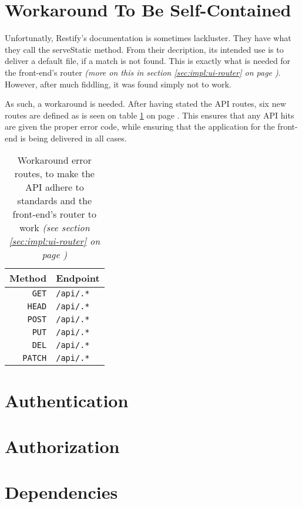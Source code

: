 	\section{Workaround To Be Self-Contained}
		Unfortunatly, Restify's documentation is sometimes lackluster. They have what they call the serveStatic method. From their decription, its intended use is to deliver a default file, if a match is not found. This is exactly what is needed for the front-end's router \emph{(more on this in section \ref{sec:impl:ui-router} on page \pageref{sec:impl:ui-router})}. However, after much fiddling, it was found simply not to work.

		As such, a workaround is needed. After having stated the API routes, six new routes are defined as is seen on table \ref{tab:api:workaround} on page \pageref{tab:api:workaround}. This ensures that any API hits are given the proper error code, while ensuring that the application for the front-end is being delivered in all cases.
		\begin{table}
			\begin{tabular}{r | l}
				\textbf{Method} & \textbf{Endpoint} \\
				\hline
				\verb=GET=		& \verb=/api/.*= \\
				\verb=HEAD=		& \verb=/api/.*= \\	
				\verb=POST=		& \verb=/api/.*= \\	
				\verb=PUT=		& \verb=/api/.*= \\
				\verb=DEL=		& \verb=/api/.*= \\
				\verb=PATCH=	& \verb=/api/.*= \\	
			\end{tabular}
			\caption{Workaround error routes, to make the API adhere to standards and the front-end's router to work \emph{(see section \ref{sec:impl:ui-router} on page \pageref{sec:impl:ui-router})}}
			\label{tab:api:workaround}
		\end{table}

	\section{Authentication}

	\section{Authorization}

	\section{Dependencies}


